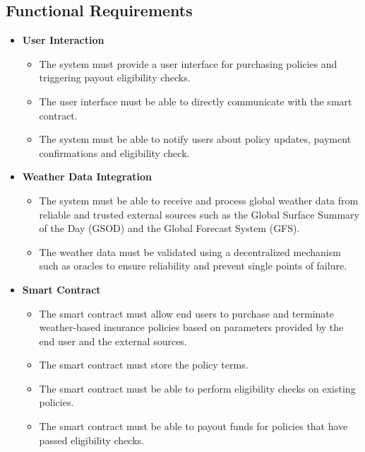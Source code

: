 \subsection{Functional Requirements}\label{subsection:functionalRequirements}
\begin{itemize}
    \item \textbf{User Interaction}
    \begin{itemize}
        \item The system must provide a user interface for purchasing policies and triggering payout eligibility checks.
        \item The user interface must be able to directly communicate with the smart contract.
        \item The system must be able to notify users about policy updates, payment confirmations and eligibility check.
    \end{itemize}

    \item \textbf{Weather Data Integration} 
    \begin{itemize}
        \item The system must be able to receive and process global weather data from reliable and trusted external sources such as the Global Surface Summary of the Day (GSOD) and the Global Forecast System (GFS).
        \item The weather data must be validated using a decentralized mechanism such as oracles to ensure reliability and prevent single points of failure.
    \end{itemize}
    
    \item \textbf{Smart Contract}
    \begin{itemize}
        \item The smart contract must allow end users to purchase and terminate weather-based insurance policies based on parameters provided by the end user and the external sources.
        \item The smart contract must store the policy terms.
        \item The smart contract must be able to perform eligibility checks on existing policies.
        \item The smart contract must be able to payout funds for policies that have passed eligibility checks.
    \end{itemize}
\end{itemize}

